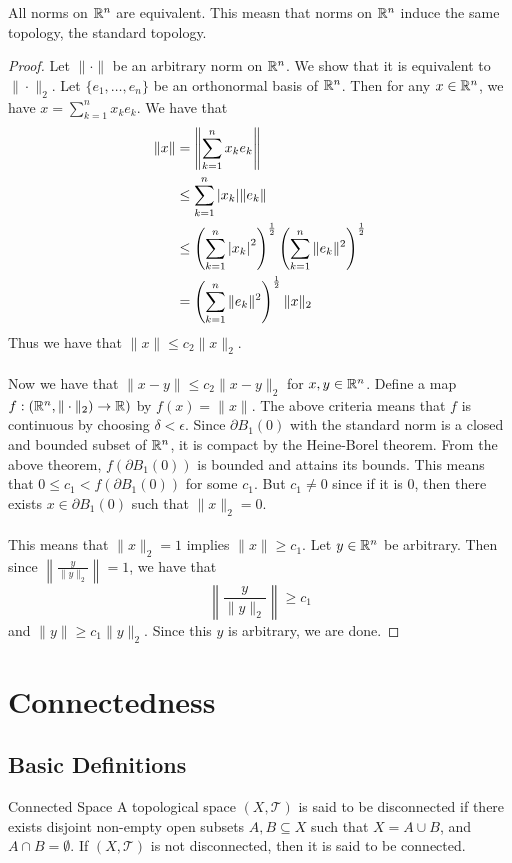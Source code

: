 \documentclass[a4paper]{article}
\begin{document}
\begin{thm}{}{} All norms on $\mathbb{R}^n$ are equivalent. This measn that norms on $\mathbb{R}^n$ induce the same topology, the standard topology. \tcbline
\begin{proof}
Let $\|\cdot\|$ be an arbitrary norm on $\mathbb{R}^n$. We show that it is equivalent to $\|\cdot\|_2$. Let $\{e_1,\dots,e_n\}$ be an orthonormal basis of $\mathbb{R}^n$. Then for any $x\in\mathbb{R}^n$, we have $x=\sum_{k=1}^nx_ke_k$. We have that 
\begin{align*}
\|x\|&=\left\|\sum_{k=1}^nx_ke_k\right\|\\
&\leq\sum_{k=1}^n\abs{x_k}\|e_k\|\\
&\leq\left(\sum_{k=1}^n\abs{x_k}^2\right)^{\frac{1}{2}}\left(\sum_{k=1}^n\|e_k\|^2\right)^{\frac{1}{2}}\\
&=\left(\sum_{k=1}^n\|e_k\|^2\right)^{\frac{1}{2}}\|x\|_2
\end{align*}
Thus we have that $\|x\|\leq c_2\|x\|_2$. \\~\\
Now we have that $\|x-y\|\leq c_2\|x-y\|_2$ for $x,y\in\mathbb{R}^n$. Define a map $f:(\mathbb{R}^n,\|\cdot\|_2)\to\mathbb{R})$ by $f(x)=\|x\|$. The above criteria means that $f$ is continuous by choosing $\delta<\epsilon$. Since $\partial B_1(0)$ with the standard norm is a closed and bounded subset of $\mathbb{R}^n$, it is compact by the Heine-Borel theorem. From the above theorem, $f(\partial B_1(0))$ is bounded and attains its bounds. This means that $0\leq c_1<f(\partial B_1(0))$ for some $c_1$. But $c_1\neq 0$ since if it is $0$, then there exists $x\in\partial B_1(0)$ such that $\|x\|_2=0$. \\~\\
This means that $\|x\|_2=1$ implies $\|x\|\geq c_1$. Let $y\in\mathbb{R}^n$ be arbitrary. Then since $\left\|\frac{y}{\|y\|_2}\right\|=1$, we have that $$\left\|\frac{y}{\|y\|_2}\right\|\geq c_1$$ and $\|y\|\geq c_1\|y\|_2$. Since this $y$ is arbitrary, we are done. 
\end{proof}
\end{thm}

\pagebreak
\section{Connectedness}
\subsection{Basic Definitions}
\begin{defn}{Connected Space}{} A topological space $(X,\mathcal{T})$ is said to be disconnected if there exists disjoint non-empty open subsets $A,B\subseteq X$ such that $X=A\cup B$, and $A\cap B=\emptyset$. If $(X,\mathcal{T})$ is not disconnected, then it is said to be connected. 
\end{defn}
\end{document}
